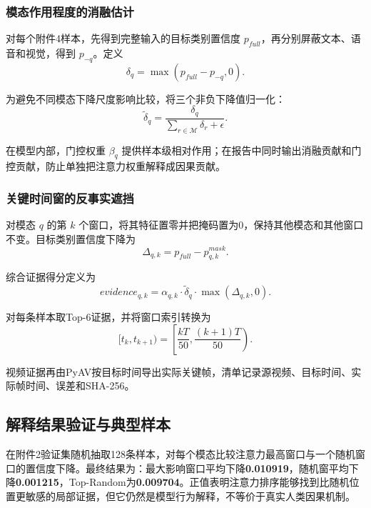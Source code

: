 \documentclass{gmcmthesis}
\newcommand{\M}{\mathcal{M}}
\newcommand{\keymetric}[1]{\textbf{#1}}
\begin{document}
\subsubsection{模态作用程度的消融估计}
对每个附件4样本，先得到完整输入的目标类别置信度 $p_{full}$，再分别屏蔽文本、语音和视觉，得到 $p_{-q}$。定义
\begin{equation}
\delta_q=\max\left(p_{full}-p_{-q},0\right).
\end{equation}
\par\indent 为避免不同模态下降尺度影响比较，将三个非负下降值归一化：
\begin{equation}
\widetilde\delta_q=\frac{\delta_q}{\sum_{r\in\M}\delta_r+\epsilon}.
\end{equation}
\par\indent 在模型内部，门控权重 $\beta_q$ 提供样本级相对作用；在报告中同时输出消融贡献和门控贡献，防止单独把注意力权重解释成因果贡献。
\subsubsection{关键时间窗的反事实遮挡}
对模态 $q$ 的第 $k$ 个窗口，将其特征置零并把掩码置为0，保持其他模态和其他窗口不变。目标类别置信度下降为
\begin{equation}
\Delta_{q,k}=p_{full}-p_{q,k}^{mask}.
\end{equation}
\par\indent 综合证据得分定义为
\begin{equation}
evidence_{q,k}=\alpha_{q,k}\cdot\widetilde\delta_q\cdot\max(\Delta_{q,k},0).
\label{eq:evidence}
\end{equation}
\par\indent 对每条样本取Top-6证据，并将窗口索引转换为
\begin{equation}
[t_k,t_{k+1})=\left[\frac{kT}{50},\frac{(k+1)T}{50}\right).
\label{eq:window_interval}
\end{equation}
\par\indent 视频证据再由PyAV按目标时间导出实际关键帧，清单记录源视频、目标时间、实际帧时间、误差和SHA-256。
\subsection{解释结果验证与典型样本}
在附件2验证集随机抽取128条样本，对每个模态比较注意力最高窗口与一个随机窗口的置信度下降。最终结果为：最大影响窗口平均下降\keymetric{0.010919}，随机窗平均下降\keymetric{0.001215}，Top-Random为\keymetric{0.009704}。正值表明注意力排序能够找到比随机位置更敏感的局部证据，但它仍然是模型行为解释，不等价于真实人类因果机制。
\end{document}
